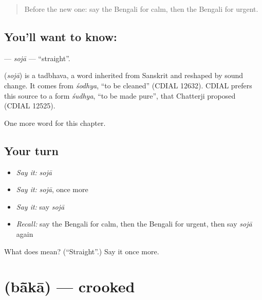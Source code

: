 \label{lesson:BN-C139-soja}



\begin{quote}
Before the new one: say the Bengali for calm, then the Bengali for urgent.
\end{quote}

\subsection*{You'll want to know: }
\textbf{} — \emph{sojā} — \textquotedblleft{}straight\textquotedblright{}.

\begin{cousinweb}
\textbf{} (\emph{sojā}) is a tadbhava, a word inherited from Sanskrit and reshaped by sound change. It comes from \emph{śodhya}, \textquotedblleft{}to be cleaned\textquotedblright{} (CDIAL 12632). CDIAL prefers this source to a form \emph{śudhya}, \textquotedblleft{}to be made pure\textquotedblright{}, that Chatterji proposed (CDIAL 12525).
\end{cousinweb}

\begin{grammarlens}[title={What you've built}]
One more word for this chapter.
\end{grammarlens}

\subsection*{Your turn}
\begin{itemize}
\raggedright
  \item \emph{Say it:} \emph{sojā}
  \item \emph{Say it:} \emph{sojā}, once more
  \item \emph{Say it:} say \emph{sojā}
  \item \emph{Recall:} say the Bengali for calm, then the Bengali for urgent, then say \emph{sojā} again
\end{itemize}

\begin{tcolorbox}[breakable,colback=teal!4,colframe=teal!35!black,title={Before you move on}]
What does  mean? (\textquotedblleft{}Straight\textquotedblright{}.) Say it once more.
\end{tcolorbox}
\section[\texorpdfstring{\bn{বাঁকা} (bā̃kā)}{বাঁকা (bā̃kā)}]{ (bā̃kā) — crooked}

